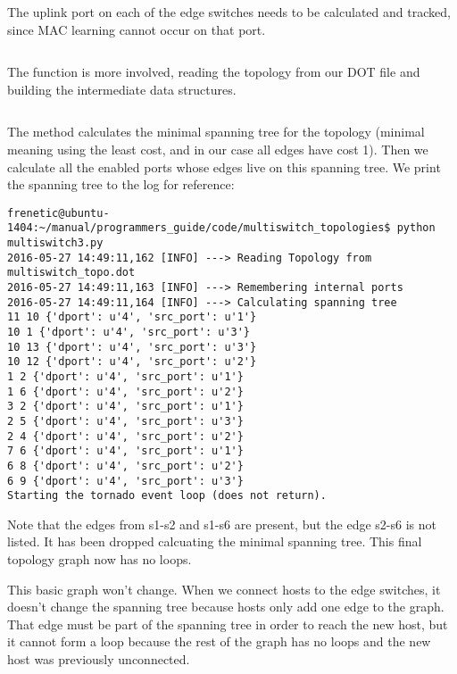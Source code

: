 \inputminted[firstline=29,lastline=33]{python}{code/multiswitch_topologies/network_information_base_from_file.py}

The uplink port on each of the edge switches needs to be calculated and tracked, since MAC learning cannot
occur on that port.

\inputminted[firstline=18,lastline=19]{python}{code/multiswitch_topologies/network_information_base_from_file.py}

The  function is more involved, reading the topology from our DOT file and building the 
intermediate data structures.

\inputminted[firstline=40,lastline=94]{python}{code/multiswitch_topologies/network_information_base_from_file.py}

The  method 
calculates the minimal spanning tree for the topology (minimal meaning using the least cost, and
in our case all edges have cost 1).  Then we calculate all the enabled ports whose edges live on this
spanning tree.  We print the spanning tree to the log for reference:

\begin{verbatim}
frenetic@ubuntu-1404:~/manual/programmers_guide/code/multiswitch_topologies$ python multiswitch3.py
2016-05-27 14:49:11,162 [INFO] ---> Reading Topology from multiswitch_topo.dot
2016-05-27 14:49:11,163 [INFO] ---> Remembering internal ports
2016-05-27 14:49:11,164 [INFO] ---> Calculating spanning tree
11 10 {'dport': u'4', 'src_port': u'1'}
10 1 {'dport': u'4', 'src_port': u'3'}
10 13 {'dport': u'4', 'src_port': u'3'}
10 12 {'dport': u'4', 'src_port': u'2'}
1 2 {'dport': u'4', 'src_port': u'1'}
1 6 {'dport': u'4', 'src_port': u'2'}
3 2 {'dport': u'4', 'src_port': u'1'}
2 5 {'dport': u'4', 'src_port': u'3'}
2 4 {'dport': u'4', 'src_port': u'2'}
7 6 {'dport': u'4', 'src_port': u'1'}
6 8 {'dport': u'4', 'src_port': u'2'}
6 9 {'dport': u'4', 'src_port': u'3'}
Starting the tornado event loop (does not return).
\end{verbatim}

Note that the edges from s1-s2 and s1-s6 are present, but the edge s2-s6 is not listed.  It has been 
dropped calcuating the minimal spanning tree.  This final topology graph now has no loops.

This basic graph won't change.  When we connect hosts to the edge switches, it doesn't change the 
spanning tree because hosts only add one edge to the graph.  That edge must be part of the spanning tree
in order to reach the new host, but it cannot form a loop because the rest of the graph has no loops
and the new host was previously unconnected.  


